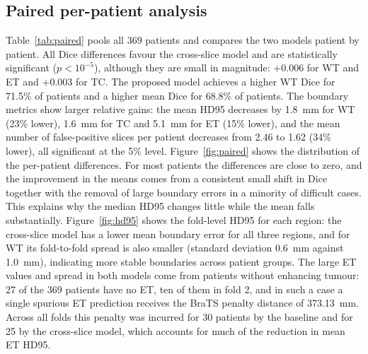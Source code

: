 \subsection{Paired per-patient analysis}
Table~\ref{tab:paired} pools all 369 patients and compares the two models patient by patient. All Dice differences favour the cross-slice model and are statistically significant ($p < 10^{-5}$), although they are small in magnitude: $+0.006$ for WT and ET and $+0.003$ for TC. The proposed model achieves a higher WT Dice for 71.5\% of patients and a higher mean Dice for 68.8\% of patients. The boundary metrics show larger relative gains: the mean HD95 decreases by 1.8~mm for WT (23\% lower), 1.6~mm for TC and 5.1~mm for ET (15\% lower), and the mean number of false-positive slices per patient decreases from 2.46 to 1.62 (34\% lower), all significant at the 5\% level. Figure~\ref{fig:paired} shows the distribution of the per-patient differences. For most patients the differences are close to zero, and the improvement in the means comes from a consistent small shift in Dice together with the removal of large boundary errors in a minority of difficult cases. This explains why the median HD95 changes little while the mean falls substantially. Figure~\ref{fig:hd95} shows the fold-level HD95 for each region: the cross-slice model has a lower mean boundary error for all three regions, and for WT its fold-to-fold spread is also smaller (standard deviation 0.6~mm against 1.0~mm), indicating more stable boundaries across patient groups. The large ET values and spread in both models come from patients without enhancing tumour: 27 of the 369 patients have no ET, ten of them in fold 2, and in such a case a single spurious ET prediction receives the BraTS penalty distance of 373.13~mm. Across all folds this penalty was incurred for 30 patients by the baseline and for 25 by the cross-slice model, which accounts for much of the reduction in mean ET HD95.

